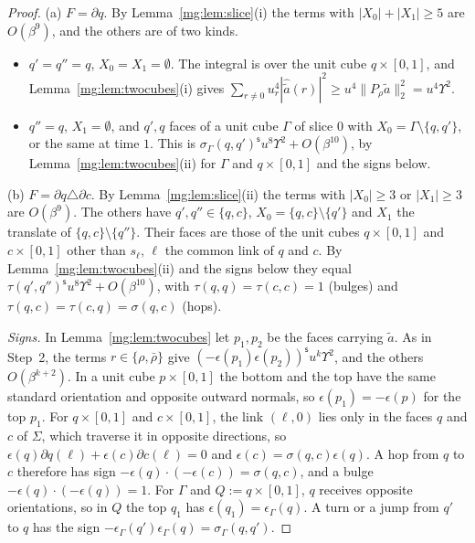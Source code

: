 \documentclass[11pt,a4paper]{article}
\theoremstyle{definition}
\theoremstyle{remark}
\newcommand{\norm}[1]{\lVert #1\rVert}
\begin{document}
\begin{proof}
(a) $F=\partial q$. By Lemma~\ref{mg:lem:slice}(i) the terms with $|X_0|+|X_1|\ge5$ are $O(\beta^9)$, and the others are of two kinds.
\begin{itemize}
\item $q'=q''=q$, $X_0=X_1=\emptyset$. The integral is over the unit cube $q\times[0,1]$, and Lemma~\ref{mg:lem:twocubes}(i) gives
$\sum_{r\ne0}u_r^4|\hat{\tilde a}(r)|^2\ge u^4\norm{P_\rho\tilde a}_2^2=u^4\Upsilon^2$.
\item $q''=q$, $X_1=\emptyset$, and $q',q$ faces of a unit cube $\Gamma$ of slice $0$ with $X_0=\Gamma\setminus\{q,q'\}$, or the same at time $1$. This is
$\sigma_\Gamma(q,q')^{\mathsf s}u^8\Upsilon^2+O(\beta^{10})$, by Lemma~\ref{mg:lem:twocubes}(ii) for $\Gamma$ and $q\times[0,1]$ and the signs below.
\end{itemize}

(b) $F=\partial q\triangle\partial c$. By Lemma~\ref{mg:lem:slice}(ii) the terms with $|X_0|\ge3$ or $|X_1|\ge3$ are $O(\beta^9)$. The others have
$q',q''\in\{q,c\}$, $X_0=\{q,c\}\setminus\{q'\}$ and $X_1$ the translate of $\{q,c\}\setminus\{q''\}$. Their faces are those of the unit cubes $q\times[0,1]$
and $c\times[0,1]$ other than $s_\ell$, $\ell$ the common link of $q$ and $c$. By Lemma~\ref{mg:lem:twocubes}(ii) and the signs below they equal
$\tau(q',q'')^{\mathsf s}u^8\Upsilon^2+O(\beta^{10})$, with $\tau(q,q)=\tau(c,c)=1$ (bulges) and $\tau(q,c)=\tau(c,q)=\sigma(q,c)$ (hops).

\emph{Signs.} In Lemma~\ref{mg:lem:twocubes} let $p_1,p_2$ be the faces carrying $\tilde a$. As in Step~2, the terms $r\in\{\rho,\bar\rho\}$ give
$(-\epsilon(p_1)\epsilon(p_2))^{\mathsf s}u^k\Upsilon^2$, and the others $O(\beta^{k+2})$. In a unit cube $p\times[0,1]$ the bottom and the top have the same
standard orientation and opposite outward normals, so $\epsilon(p_1)=-\epsilon(p)$ for the top $p_1$. For $q\times[0,1]$ and $c\times[0,1]$, the link $(\ell,0)$ lies
only in the faces $q$ and $c$ of $\Sigma$, which traverse it in opposite directions, so $\epsilon(q)\partial q(\ell)+\epsilon(c)\partial c(\ell)=0$ and
$\epsilon(c)=\sigma(q,c)\epsilon(q)$. A hop from $q$ to $c$ therefore has sign $-\epsilon(q)\cdot(-\epsilon(c))=\sigma(q,c)$, and a bulge $-\epsilon(q)\cdot(-\epsilon(q))=1$.
For $\Gamma$ and $Q:=q\times[0,1]$, $q$ receives opposite orientations, so in $Q$ the top $q_1$ has $\epsilon(q_1)=\epsilon_\Gamma(q)$. A turn or a jump from
$q'$ to $q$ has the sign $-\epsilon_\Gamma(q')\epsilon_\Gamma(q)=\sigma_\Gamma(q,q')$.


\end{proof}
\end{document}
